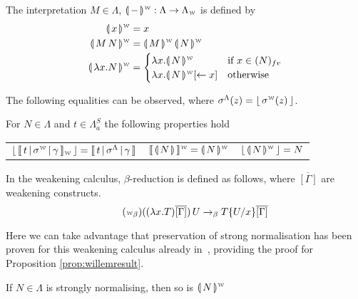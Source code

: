 \documentclass[a4paper,UKenglish,cleveref, autoref]{lipics-v2019}
\newcommand{\FALC}{\Lambda^{S}_{a}}
\newcommand{\WEAK}{\Lambda_{\weaksymbol}}
\newcommand{\fv}[1]{(#1)_{fv}}
\newcommand{\abs}[2]{\lambda #1 . #2}
\newcommand{\app}[2]{#1 \, #2}
\newcommand{\share}[3]{#1 [#2 \leftarrow #3]}
\newcommand{\sub}[3]{#1 \{ #2 / #3 \}}
\newcommand{\compile}[1]{\llparenthesis \, #1 \, \rrparenthesis}
\newcommand{\weaksymbol}{\mbox{\tiny $\mathcal{W}$}}
\newcommand{\readbackwmap}[3]{\llbracket \, #1 \, \vert \, #2 \, \vert \, #3  \, \rrbracket }
\newcommand{\readweakwmap}[3]{\llbracket \, #1 \, \vert \, #2 \, \vert \, #3  \, \rrbracket_{\weaksymbol} }
\newcommand{\compweak}[1]{\llparenthesis \, #1 \, \rrparenthesis^{\weaksymbol}}
\newcommand{\readbackweak}[1]{\lfloor \, #1 \, \rfloor}
\newcommand{\composeweak}[1]{\llbracket \, #1 \, \rrbracket^{\weaksymbol}}
\begin{document}
\begin{definition}
\label{def:transweak}
The interpretation $M \in \Lambda$, $\compweak{-} : \Lambda \rightarrow \WEAK$ is defined by
\begin{align*}
	\compweak{x} &= x \\
	\compweak{\app{M}{N}} &= \app{\compweak{M}}{\compweak{N}} \\
	\compweak{\abs{x}{N}} &=
	\begin{cases}
		\abs{x}{\compweak{N}} & \text{if } x \in \fv{N} \\
		\abs{x}{\compweak{N} \share{}{}{x}} & \text{otherwise}
	\end{cases}
\end{align*}
\end{definition}
\noindent The following equalities can be observed, where $\sigma^{\Lambda}(z) = \readbackweak{\sigma^{\weaksymbol}(z)} $.
\begin{proposition}
\label{prop:equalterms}
For $N \in \Lambda$ and $t \in \FALC$ the following properties hold
\begin{center}
\begin{tabular}{c@{\hskip 0.5in} c@{\hskip 0.5in} c}
	$\readbackweak{\readweakwmap{t}{\sigma^{\weaksymbol}}{\gamma}} = \readbackwmap{t}{\sigma^{\Lambda}}{\gamma}$
	&
	$\composeweak{\compile{N}} = \compweak{N}$
	&
	$\readbackweak{\compweak{N}} = N$
\end{tabular}

\end{center}

\end{proposition}

\begin{definition}
In the weakening calculus, $\beta$-reduction is defined as follows, where $\overline{[\Gamma]}$ are weakening constructs.
\begin{equation}
\tag{$\weaksymbol_{\beta}$}
	\app{((\abs{x}{T}) \overline{[\Gamma]})}{U} \rightarrow_{\beta} \sub{T}{U}{x} \overline{[\Gamma]} \\
\end{equation}
\end{definition}

\noindent Here we can take advantage that preservation of strong normalisation has been proven for this weakening calculus already in~\cite{Gundersen-Heijltjes-Parigot-2013-LICS}, providing the proof for Proposition \ref{prop:willemresult}.

\begin{proposition}
\label{prop:willemresult}
 If $N \in \Lambda$ is strongly normalising, then so is $\compweak{N}$
\end{proposition}
\end{document}
